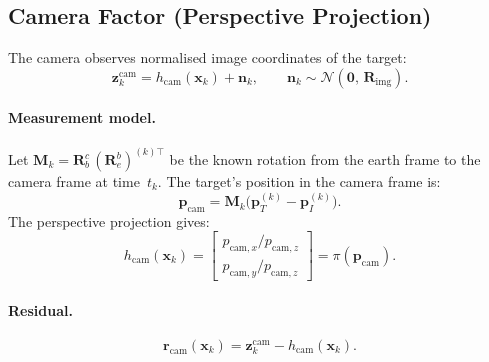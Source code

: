 \documentclass[11pt,a4paper]{article}
\newcommand{\state}{\bm{x}}
\newcommand{\meas}{\bm{z}}
\newcommand{\resid}{\bm{r}}
\begin{document}
\subsection{Camera Factor (Perspective Projection)}
\label{sec:camera}

The camera observes normalised image coordinates of the target:
\begin{equation}
  \meas_k^{\text{cam}} = h_{\text{cam}}(\state_k) + \bm{n}_k,
  \qquad
  \bm{n}_k \sim \mathcal{N}(\bm{0},\, \bm{R}_{\text{img}}).
\end{equation}

\paragraph{Measurement model.}  Let $\bm{M}_k = \bm{R}^c_b\,
(\bm{R}^b_e)^{(k)\top}$ be the known rotation from the earth frame to
the camera frame at time~$t_k$.  The target's position in the camera
frame is:
\begin{equation}
  \bm{p}_{\text{cam}} = \bm{M}_k \bigl(\bm{p}_T^{(k)} - \bm{p}_I^{(k)}\bigr).
\end{equation}
The perspective projection gives:
\begin{equation}
  h_{\text{cam}}(\state_k) =
  \begin{bmatrix}
    p_{\text{cam},x} / p_{\text{cam},z} \\
    p_{\text{cam},y} / p_{\text{cam},z}
  \end{bmatrix}
  = \pi(\bm{p}_{\text{cam}}).
  \label{eq:cam_model}
\end{equation}

\paragraph{Residual.}
\begin{equation}
  \resid_{\text{cam}}(\state_k) = \meas_k^{\text{cam}} - h_{\text{cam}}(\state_k).
\end{equation}
\end{document}
